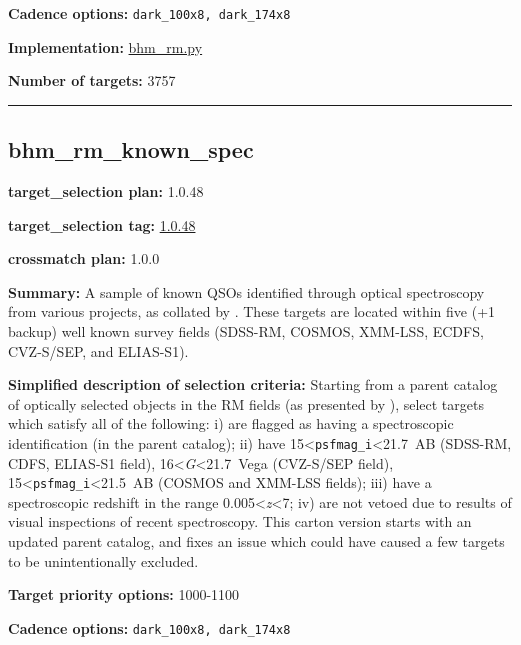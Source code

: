 \noindent\textbf{Cadence options:} \texttt{dark\_100x8,\ dark\_174x8}

\noindent\textbf{Implementation:}
\href{https://github.com/sdss/target_selection/blob/1.0.48/python/target_selection/cartons/bhm_rm.py}{bhm\_rm.py}

\noindent\textbf{Number of targets:} 3757

\begin{center}\rule{0.5\linewidth}{0.5pt}\end{center}

\hypertarget{bhm_rm_known_spec_plan1.0.48}{%
\subsection{bhm\_rm\_known\_spec}\label{bhm_rm_known_spec_plan1.0.48}}

\noindent\textbf{target\_selection plan:} 1.0.48

\noindent\textbf{target\_selection tag:}
\href{https://github.com/sdss/target_selection/tree/1.0.48/}{1.0.48}

\noindent\textbf{crossmatch plan:} 1.0.0

\noindent\textbf{Summary:} A sample of known QSOs identified through optical
spectroscopy from various projects, as collated by
\citet{Yang2022}. These targets are located within five (+1 backup) well
known survey fields (SDSS-RM, COSMOS, XMM-LSS, ECDFS, CVZ-S/SEP, and
ELIAS-S1).

\noindent\textbf{Simplified description of selection criteria:} Starting from a
parent catalog of optically selected objects in the RM fields (as
presented by
\citealt{Yang2022}), select targets which satisfy all of the following: i)
are flagged as having a spectroscopic identification (in the parent
catalog); ii) have 15\textless{}\texttt{psfmag\_i}\textless21.7~AB
(SDSS-RM, CDFS, ELIAS-S1 field), 16\textless{}\emph{G}\textless21.7~Vega
(CVZ-S/SEP field), 15\textless{}\texttt{psfmag\_i}\textless21.5~AB
(COSMOS and XMM-LSS fields); iii) have a spectroscopic redshift in the
range 0.005\textless{}\emph{z}\textless7; iv) are not vetoed due to
results of visual inspections of recent spectroscopy. This carton
version starts with an updated parent catalog, and fixes an issue which
could have caused a few targets to be unintentionally excluded.


\noindent\textbf{Target priority options:} 1000-1100

\noindent\textbf{Cadence options:} \texttt{dark\_100x8,\ dark\_174x8}

